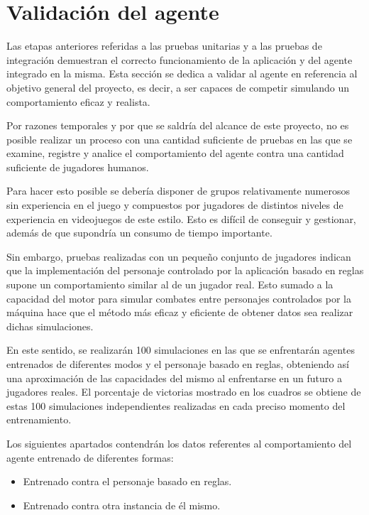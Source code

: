 \section{Validación del agente}

Las etapas anteriores referidas a las pruebas unitarias y a las pruebas de integración demuestran el correcto funcionamiento de la aplicación y del agente integrado en la misma. Esta sección se dedica a validar al agente en referencia al objetivo general del proyecto, es decir, a ser capaces de competir simulando un comportamiento eficaz y realista.

\bigskip

Por razones temporales y por que se saldría del alcance de este proyecto, no es posible realizar un proceso con una cantidad suficiente de pruebas en las que se examine, registre y analice el comportamiento del agente contra una cantidad suficiente de jugadores humanos.

\bigskip

Para hacer esto posible se debería disponer de grupos relativamente numerosos sin experiencia en el juego y compuestos por jugadores de distintos niveles de experiencia en videojuegos de este estilo. Esto es difícil de conseguir y gestionar, además de que supondría un consumo de tiempo importante.

\bigskip

Sin embargo, pruebas realizadas con un pequeño conjunto de jugadores indican que la implementación del personaje controlado por la aplicación basado en reglas supone un comportamiento similar al de un jugador real. Esto sumado a la capacidad del motor para simular combates entre personajes controlados por la máquina hace que el método más eficaz y eficiente de obtener datos sea realizar dichas simulaciones.

\bigskip

En este sentido, se realizarán 100 simulaciones en las que se enfrentarán agentes entrenados de diferentes modos y el personaje basado en reglas, obteniendo así una aproximación de las capacidades del mismo al enfrentarse en un futuro a jugadores reales. El porcentaje de victorias mostrado en los cuadros se obtiene de estas 100 simulaciones independientes realizadas en cada preciso momento del entrenamiento.

\bigskip

Los siguientes apartados contendrán los datos referentes al comportamiento del agente entrenado de diferentes formas:

\begin{itemize}
	\item Entrenado contra el personaje basado en reglas.
	\item Entrenado contra otra instancia de él mismo.
\end{itemize}

